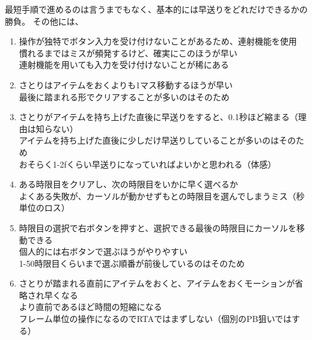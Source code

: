 \clearpage
最短手順で進めるのは言うまでもなく、基本的には早送りをどれだけできるかの勝負。
その他には、
\begin{enumerate}[label={\sarrow}]
\item 操作が独特でボタン入力を受け付けないことがあるため、連射機能を使用\\
      慣れるまではミスが頻発するけど、確実にこのほうが早い\\
      連射機能を用いても入力を受け付けないことが稀にある
\item さとりはアイテムをおくよりも1マス移動するほうが早い\\
      最後に踏まれる形でクリアすることが多いのはそのため
\item さとりがアイテムを持ち上げた直後に早送りをすると、0.1秒ほど縮まる（理由は知らない）\\
      アイテムを持ち上げた直後に少しだけ早送りしていることが多いのはそのため\\
      おそらく1-2fくらい早送りになっていればよいかと思われる（体感）
\item ある時限目をクリアし、次の時限目をいかに早く選べるか\\
      よくある失敗が、カーソルが動かせずもとの時限目を選んでしまうミス（秒単位のロス）
\item 時限目の選択で右ボタンを押すと、選択できる最後の時限目にカーソルを移動できる\\
      個人的には右ボタンで選ぶほうがやりやすい\\
      1-50時限目くらいまで選ぶ順番が前後しているのはそのため
\item さとりが踏まれる直前にアイテムをおくと、アイテムをおくモーションが省略され早くなる\\
      より直前であるほど時間の短縮になる\\
      フレーム単位の操作になるのでRTAではまずしない（個別のPB狙いではする）
\end{enumerate}



